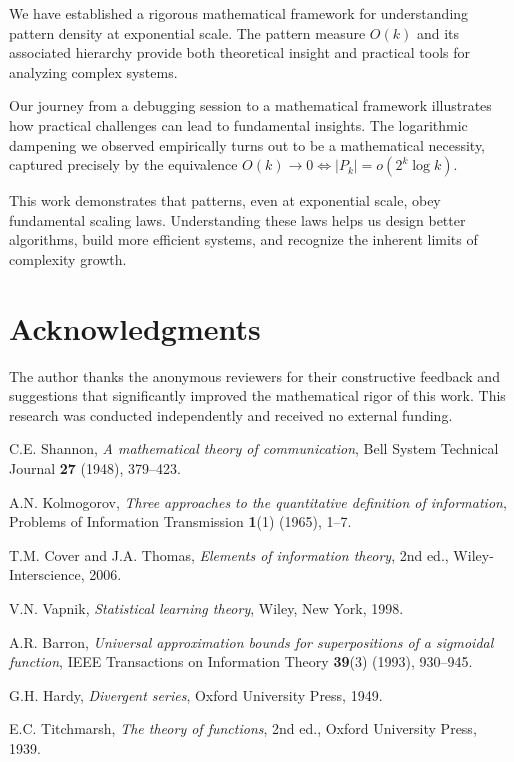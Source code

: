 \documentclass[11pt]{article}
\theoremstyle{definition}
\begin{document}
We have established a rigorous mathematical framework for understanding pattern density at exponential scale. The pattern measure $O(k)$ and its associated hierarchy provide both theoretical insight and practical tools for analyzing complex systems.

Our journey from a debugging session to a mathematical framework illustrates how practical challenges can lead to fundamental insights. The logarithmic dampening we observed empirically turns out to be a mathematical necessity, captured precisely by the equivalence $O(k)\to 0\iff |P_k|=o(2^k\log k)$.

This work demonstrates that patterns, even at exponential scale, obey fundamental scaling laws. Understanding these laws helps us design better algorithms, build more efficient systems, and recognize the inherent limits of complexity growth.

\section*{Acknowledgments}

The author thanks the anonymous reviewers for their constructive feedback and suggestions that significantly improved the mathematical rigor of this work. This research was conducted independently and received no external funding.

\begin{thebibliography}{99}

 C.E. Shannon, \emph{A mathematical theory of communication}, Bell System Technical Journal \textbf{27} (1948), 379--423.

 A.N. Kolmogorov, \emph{Three approaches to the quantitative definition of information}, Problems of Information Transmission \textbf{1}(1) (1965), 1--7.

 T.M. Cover and J.A. Thomas, \emph{Elements of information theory}, 2nd ed., Wiley-Interscience, 2006.

 V.N. Vapnik, \emph{Statistical learning theory}, Wiley, New York, 1998.

 A.R. Barron, \emph{Universal approximation bounds for superpositions of a sigmoidal function}, IEEE Transactions on Information Theory \textbf{39}(3) (1993), 930--945.

 G.H. Hardy, \emph{Divergent series}, Oxford University Press, 1949.

 E.C. Titchmarsh, \emph{The theory of functions}, 2nd ed., Oxford University Press, 1939.

\end{thebibliography}
\end{document}
